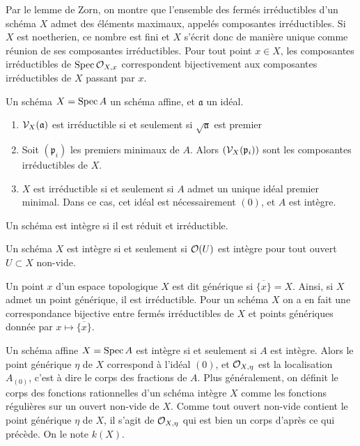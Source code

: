 Par le lemme de Zorn, on montre que l'ensemble des fermés irréductibles d'un schéma $X$ admet des éléments maximaux, appelés composantes irréductibles. Si $X$ est noetherien, ce nombre est fini et $X$ s'écrit donc de manière unique comme réunion de ses composantes irréductibles. Pour tout point $x\in X$, les composantes irréductibles de $\operatorname{Spec} \mathcal{O}_{X,x}$ correspondent bijectivement aux composantes irréductibles de $X$ passant par $x$.

\begin{prop}
Un schéma $X=\operatorname{Spec} A$ un schéma affine, et $\mathfrak{a}$ un idéal.
\begin{enumerate}
\item $\mathcal{V}_X(\mathfrak{a})$ est irréductible si et seulement si $\sqrt{\mathfrak{a}}$ est premier
\item Soit $(\mathfrak{p}_i)$ les premiers minimaux de $A$. Alors $(\mathcal{V}_X(\mathfrak{p}_i))$ sont les composantes irréductibles de $X$.
\item $X$ est irréductible si et seulement si $A$ admet un unique idéal premier minimal. Dans ce cas, cet idéal est nécessairement $(0)$, et $A$ est intègre.
\end{enumerate}
\end{prop}

\begin{defn}
Un schéma est intègre si il est réduit et irréductible.
\end{defn}

\begin{prop}
Un schéma $X$ est intègre si et seulement si $\mathcal{O}(U)$ est intègre pour tout ouvert $U\subset X$ non-vide.
\end{prop}

Un point $x$ d'un espace topologique $X$ est dit générique si $\overline{\lbrace x\rbrace}=X$. Ainsi, si $X$ admet un point générique, il est irréductible. Pour un schéma $X$ on a en fait une correspondance bijective entre fermés irréductibles de $X$ et points génériques donnée par $x\mapsto \overline{\lbrace x\rbrace}$. 

Un schéma affine $X=\operatorname{Spec} A$ est intègre si et seulement si $A$ est intègre. Alors le point générique $\eta$ de $X$ correspond à l'idéal $(0)$, et $\mathcal{O}_{X,\eta}$ est la localisation $A_{(0)}$, c'est à dire le corps des fractions de $A$. Plus généralement, on définit le corps des fonctions rationnelles d'un schéma intègre $X$ comme les fonctions régulières sur un ouvert non-vide de $X$. Comme tout ouvert non-vide contient le point générique $\eta$ de $X$, il s'agit de $\mathcal{O}_{X,\eta}$ qui est bien un corps d'après ce qui précède. On le note $k(X)$.

